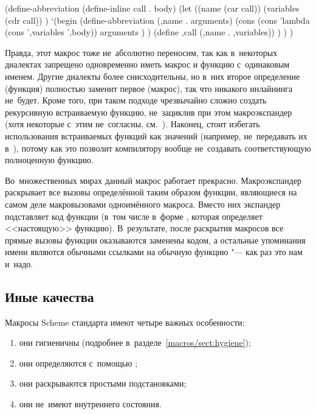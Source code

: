 \begin{code:lisp}
(define-abbreviation (define-inline call . body)
  (let ((name      (car call))
        (variables (cdr call)) )
    `(begin
       (define-abbreviation (,name . arguments)
         (cons (cons 'lambda (cons ',variables ',body))
               arguments ) )
       (define ,call (,name . ,variables)) ) ) )
\end{code:lisp}

Правда, этот макрос тоже не~абсолютно переносим, так как в~некоторых диалектах
запрещено одновременно иметь макрос и функцию с~одинаковым именем. Другие
диалекты более снисходительны, но в~них второе определение (функция) полностью
заменит первое (макрос), так что никакого инлайнинга не~будет. Кроме того,
при таком подходе чрезвычайно сложно создать рекурсивную встраиваемую функцию,
не~зациклив при этом макроэкспандер (хотя некоторые с~этим не~согласны,
см.~\cite{bak92b}). Наконец, стоит избегать использования встраиваемых функций
как значений (например, не~передавать их в~), потому как это позволит
компилятору вообще не~создавать соответствующую полноценную функцию.

Во~множественных мирах данный макрос работает прекрасно. Макроэкспандер
раскрывает все вызовы определённой таким образом функции, являющиеся на самом
деле макровызовами одноимённого макроса. Вместо них экспандер подставляет код
функции (в~том числе в~форме , которая определяет <<настоящую>>
функцию). В~результате, после раскрытия макросов все прямые вызовы функции
оказываются заменены кодом, а остальные упоминания имени являются обычными
ссылками на обычную функцию "--- как раз это нам и~надо.


\subsection{Иные качества}\label{macros/usage/ssect:other}

Макросы Scheme стандарта {\RnRS} имеют четыре важных особенности:

\begin{enumerate}
  \item они гигиеничны (подробнее в~разделе~\ref{macros/sect:hygiene});
  \item они определяются с~помощью ;
  \item они раскрываются простыми подстановками;
  \item они не~имеют внутреннего состояния.
\end{enumerate}

